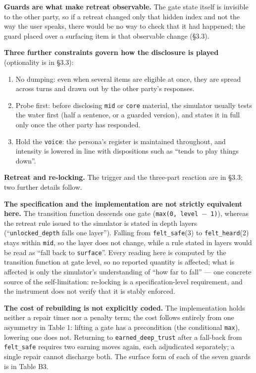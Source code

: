 \documentclass[letterpaper]{article}
\begin{document}
\textbf{Guards are what make retreat observable.} The gate state itself is invisible to the other party, so if a retreat changed only that hidden index and not the way the user speaks, there would be no way to check that it had happened; the guard placed over a surfacing item is that observable change (\S{}3.3).

\textbf{Three further constraints govern how the disclosure is played} (optionality is in \S{}3.3):

\begin{enumerate}
\item No dumping: even when several items are eligible at once, they are spread across turns and drawn out by the other party's responses.
\item Probe first: before disclosing \texttt{mid} or \texttt{core} material, the simulator usually tests the water first (half a sentence, or a guarded version), and states it in full only once the other party has responded.
\item Hold the \texttt{voice}: the persona's register is maintained throughout, and intensity is lowered in line with dispositions such as ``tends to play things down''.
\end{enumerate}

\textbf{Retreat and re-locking.} The trigger and the three-part reaction are in \S{}3.3; two further details follow.

\textbf{The specification and the implementation are not strictly equivalent here.} The transition function descends one gate (\texttt{max(0, level $-$ 1)}), whereas the retreat rule issued to the simulator is stated in depth layers (``\texttt{unlocked\_depth} falls one layer''). Falling from \texttt{felt\_safe}(3) to \texttt{felt\_heard}(2) stays within \texttt{mid}, so the layer does not change, while a rule stated in layers would be read as ``fall back to \texttt{surface}''. Every reading here is computed by the transition function at gate level, so no reported quantity is affected; what is affected is only the simulator's understanding of ``how far to fall'' --- one concrete source of the self-limitation: re-locking is a specification-level requirement, and the instrument does not verify that it is stably enforced.

\textbf{The cost of rebuilding is not explicitly coded.} The implementation holds neither a repair timer nor a penalty term; the cost follows entirely from one asymmetry in Table 1: lifting a gate has a precondition (the conditional \texttt{max}), lowering one does not. Returning to \texttt{earned\_deep\_trust} after a fall-back from \texttt{felt\_safe} requires two earning moves again, each adjudicated separately; a single repair cannot discharge both. The surface form of each of the seven guards is in Table B3.
\end{document}
